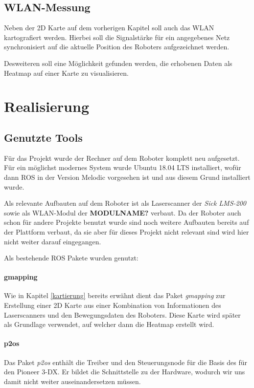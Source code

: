 \documentclass{scrartcl}%
\begin{document}
\subsection{WLAN-Messung}
Neben der 2D Karte auf dem vorherigen Kapitel soll auch das WLAN kartografiert werden. Hierbei soll die Signalstärke für ein angegebenes Netz synchronisiert auf die aktuelle Position des Roboters aufgezeichnet werden.

Desweiteren soll eine Möglichkeit gefunden werden, die erhobenen Daten als Heatmap auf einer Karte zu visualisieren.

\newpage
\section{Realisierung}
\subsection{Genutzte Tools}
Für das Projekt wurde der Rechner auf dem Roboter komplett neu aufgesetzt. Für ein möglichst modernes System wurde Ubuntu 18.04 LTS installiert, wofür dann ROS in der Version Melodic vorgesehen ist und aus diesem Grund installiert wurde.

Als relevante Aufbauten auf dem Roboter ist als Laserscanner der \textit{Sick LMS-200} sowie als WLAN-Modul der \textbf{MODULNAME?} verbaut. Da der Roboter auch schon für andere Projekte benutzt wurde sind noch weitere Aufbauten bereits auf der Plattform verbaut, da sie aber für dieses Projekt nicht relevant sind wird hier nicht weiter darauf eingegangen.

Als bestehende ROS Pakete wurden genutzt:

\paragraph{gmapping}
Wie in Kapitel \ref{kartierung} bereits erwähnt dient das Paket \textit{gmapping} zur Erstellung einer 2D Karte aus einer Kombination von Informationen des Laserscanners und den Bewegungsdaten des Roboters. Diese Karte wird später als Grundlage verwendet, auf welcher dann die Heatmap erstellt wird.

\paragraph{p2os}
Das Paket \textit{p2os} enthält die Treiber und den Steuerungsnode für die Basis des für den Pioneer 3-DX. Er bildet die Schnittstelle zu der Hardware, wodurch wir uns damit nicht weiter auseinandersetzen müssen. 
\end{document}
